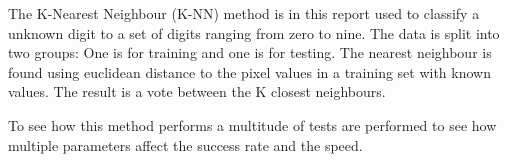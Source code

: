 

The K-Nearest Neighbour (K-NN) method is in this report used to classify a unknown digit to a set of digits ranging from zero to nine.
The data is split into two groups: One is for training and one is for testing. 
The nearest neighbour is found using euclidean distance to the pixel values in a training set with known values.
The result is a vote between the K closest neighbours.

To see how this method performs a multitude of tests are performed to see how multiple parameters affect the success rate and the speed.
